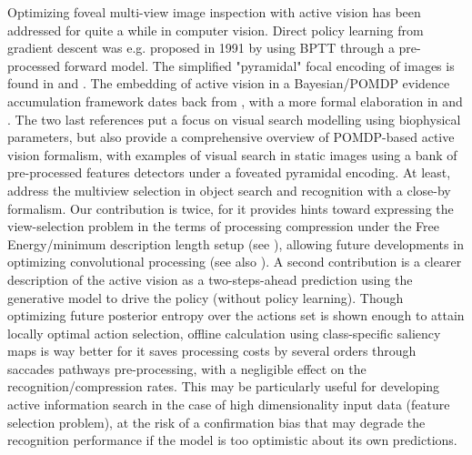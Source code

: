 \documentclass{article} %
\begin{document}
Optimizing foveal multi-view image inspection with active vision has been addressed for quite a while in computer vision. Direct policy learning from gradient descent was e.g. proposed in 1991 by \cite{schmidhuber1991learning} using BPTT through a pre-processed forward model. The simplified "pyramidal" focal encoding of images is found in \cite{kortum1996implementation,wang2003foveation} and \cite{chen2017eccentricity}. The embedding of active vision in a Bayesian/POMDP evidence accumulation framework dates back from \cite{bajcsy1988active}, with a more formal elaboration in \cite{najemnik2005optimal} and \cite{butko2010infomax}. The two last references put a focus on visual search modelling using biophysical parameters, but
\cite{butko2010infomax} also provide a comprehensive overview of POMDP-based active vision formalism, with examples of visual search in static images using a bank of pre-processed features detectors under a foveated pyramidal encoding. 
At least, \cite{potthast2016active} address the multiview selection in object search and recognition with a close-by formalism.
Our contribution is twice, for it provides hints toward expressing the view-selection problem in the terms of processing compression under the Free Energy/minimum description length setup (see \cite{hinton1994autoencoders}), allowing future developments in optimizing convolutional processing (see also \cite{louizos2017bayesian}). A second contribution is a clearer description of the active vision as a two-steps-ahead prediction using the generative model to drive the policy (without policy learning). Though optimizing future posterior entropy over the actions set is shown enough to attain locally optimal action selection, offline calculation using class-specific saliency maps is way better for it saves processing costs by several orders through saccades pathways pre-processing, with a negligible effect on the recognition/compression rates.    
This may be particularly useful for developing active information search in the case of high dimensionality input data (feature selection problem),
at the risk of a confirmation bias that may degrade the recognition performance if the model is too optimistic about its own predictions. 



\end{document}
